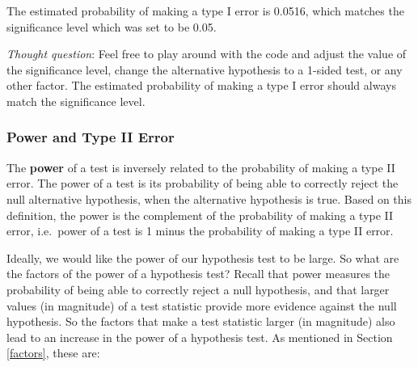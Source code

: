 \documentclass[
]{book}
\begin{document}
The estimated probability of making a type I error is 0.0516, which matches the significance level which was set to be 0.05.

\emph{Thought question}: Feel free to play around with the code and adjust the value of the significance level, change the alternative hypothesis to a 1-sided test, or any other factor. The estimated probability of making a type I error should always match the significance level.

\hypertarget{power}{%
\subsubsection{Power and Type II Error}\label{power}}

The \textbf{power} of a test is inversely related to the probability of making a type II error. The power of a test is its probability of being able to correctly reject the null alternative hypothesis, when the alternative hypothesis is true. Based on this definition, the power is the complement of the probability of making a type II error, i.e.~power of a test is 1 minus the probability of making a type II error.

Ideally, we would like the power of our hypothesis test to be large. So what are the factors of the power of a hypothesis test? Recall that power measures the probability of being able to correctly reject a null hypothesis, and that larger values (in magnitude) of a test statistic provide more evidence against the null hypothesis. So the factors that make a test statistic larger (in magnitude) also lead to an increase in the power of a hypothesis test. As mentioned in Section \ref{factors}, these are:
\end{document}
